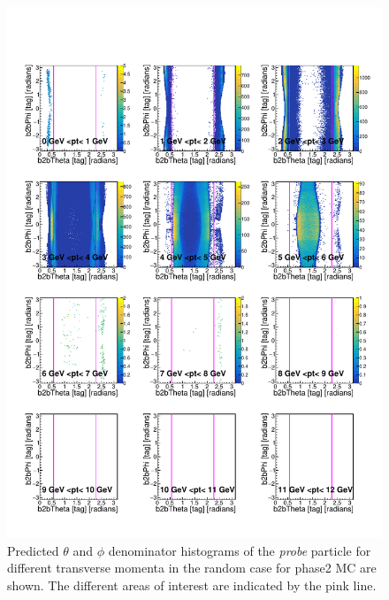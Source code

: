 \documentclass[a4paper,11pt,twosided,final,german,openbib,pdftex,listof=totoc,bibliography=totoc]{scrbook}
\begin{document}
\begin{figure}[h!]
	\includegraphics[width=\textwidth]{Plots/RTPtMRandomD_MC.pdf}
	\caption[Denominator $\theta$, $\phi$ Random Transverse Momentum MC]{Predicted $\theta$ and $\phi$ denominator histograms of the \textit{probe} particle for different transverse momenta in the random case for phase2 MC are shown. The different areas of interest are indicated by the pink line.}
	\label{plt:RTPtMRandomD_MC}
\end{figure}
\end{document}
